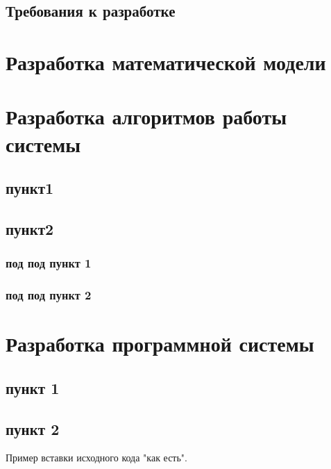 \subsection{Требования к разработке}
\lipsum[38]
\newpage



\section{Разработка математической модели}
\lipsum[40]
\newpage



\section{Разработка алгоритмов работы системы}
\subsection{пункт1}
\lipsum[9]

\subsection{пункт2}
\lipsum[10]

\subsubsection{под под пункт 1}
\lipsum[11]

\subsubsection{под под пункт 2}
\lipsum[12]
\newpage



\section{Разработка программной системы}
\subsection{пункт 1}
\lipsum[52]

\subsection{пункт 2}
Пример вставки исходного кода "как есть".


\lipsum[13]
\newpage



